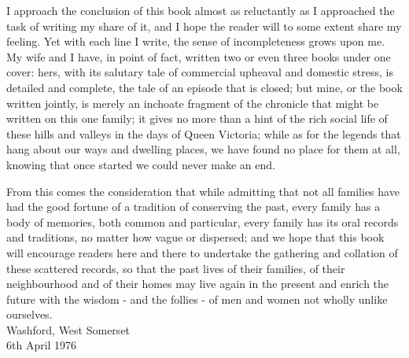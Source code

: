 
I approach the conclusion of this book almost as reluctantly as I approached the task of writing my share of it, and I hope the reader will to some extent share my feeling. Yet with each line I write, the sense of incompleteness grows upon me. My wife and I have, in point of fact, written two or even three books under one cover: hers, with its salutary tale of commercial upheaval and domestic stress, is detailed and complete, the tale of an episode that is closed; but mine, or the book written jointly, is merely an inchoate fragment of the chronicle that might be written on this one family; it gives no more than a hint of the rich social life of these hills and valleys in the days of Queen Victoria; while as for the legends that hang about our ways and dwelling places, we have found no place for them at all, knowing that once started we could never make an end.

From this comes the consideration that while admitting that not all families have had the good fortune of a tradition of conserving the past, every family has a body of memories, both common and particular, every family has its oral records and traditions, no matter how vague or dispersed; and we hope that this book will encourage readers here and there to undertake the gathering and collation of these scattered records, so that the past lives of their families, of their neighbourhood and of their homes may live again in the present and enrich the future with the wisdom - and the follies - of men and women not wholly unlike ourselves. \\

Washford, West Somerset \\
6th April 1976

